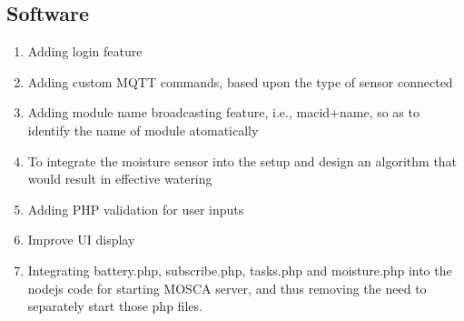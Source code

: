 \documentclass[16pt]{article}
\begin{document}
\subsection{Software}
\begin{enumerate}
 \item Adding login feature
 \item Adding custom MQTT commands, based upon the type of sensor connected
 \item Adding module name broadcasting feature, i.e., macid+name, so as to identify the name of module atomatically
 \item To integrate the moisture sensor into the setup and design an algorithm that would result in effective watering
 \item Adding PHP validation for user inputs
 \item Improve UI display
 \item Integrating battery.php, subscribe.php, tasks.php and moisture.php into the nodejs code for starting MOSCA server, and thus removing the need to separately start those php files.
\end{enumerate}
\end{document}
